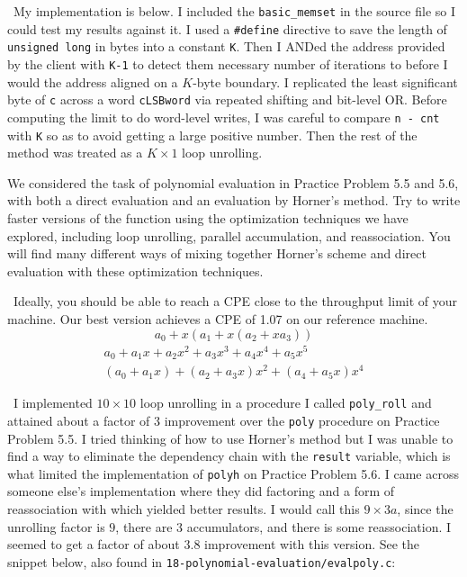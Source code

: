 \documentclass[12pt]{article}
\newenvironment{ex}[2][Exercise]{\begin{trivlist}
		\item[\hskip \labelsep {\bfseries #1}\hskip \labelsep {\bfseries #2.}]}{\end{trivlist}}
\newenvironment{sol}[1][Solution]{\begin{trivlist}
		\item[\hskip \labelsep {\bfseries #1:}]}{\end{trivlist}}
\begin{document}
\begin{sol}
	\
	My implementation is below. I included the \texttt{basic\_memset} in the source file
	so I could test my results against it. I used a \texttt{\#define} directive to save
	the length of \texttt{unsigned long} in bytes into a constant \texttt{K}. Then I
	ANDed the address provided by the client with \texttt{K-1} to detect them necessary
	number of iterations to before I would the address aligned on a $K$-byte boundary.
	I replicated the least significant byte of \texttt{c} across a word \texttt{cLSBword}
	via repeated shifting and bit-level OR. Before computing the limit to do word-level writes,
	I was careful to compare \texttt{n - cnt} with \texttt{K} so as to avoid getting a large
	positive number. Then the rest of the method was treated as a $K\times 1$ loop unrolling. 
	
\end{sol}

\begin{ex}{5.18}
	We considered the task of polynomial evaluation in Practice Problem 5.5 and 5.6, with both
	a direct evaluation and an evaluation by Horner's method. Try to write faster versions of
	the function using the optimization techniques we have explored, including loop unrolling,
	parallel accumulation, and reassociation. You will find many different ways of mixing
	together Horner's scheme and direct evaluation with these optimization techniques.
	
	\
	Ideally, you should be able to reach a CPE close to the throughput limit of your machine.
	Our best version achieves a CPE of 1.07 on our reference machine.
	\[
	a_0 + x(a_1 + x(a_2 + x a_3))
	\]
	\begin{align*}
		a_0+a_1x+a_2x^2+a_3x^3 + a_4x^4 + a_5 x^5\\
		(a_0 + a_1x) + (a_2 + a_3x) x^2 + (a_4 + a_5x)x^4
	\end{align*}
\end{ex}
 

\begin{sol}
	\
	I implemented $10\times 10$ loop unrolling in a procedure I called \texttt{poly\_roll} and
	attained about a factor of 3 improvement over the \texttt{poly} procedure on Practice Problem
	5.5. I tried thinking of how to use Horner's method but I was unable to find a way to eliminate
	the dependency chain with the \texttt{result} variable, which is what limited the
	implementation of \texttt{polyh} on Practice Problem 5.6. I came across someone else's
	implementation where they did factoring and a form of reassociation with which yielded better
	results. I would call this $9\times 3a$, since the unrolling factor is $9$, there are 3
	accumulators, and there is some reassociation. I seemed to get a factor of about $3.8$
	improvement with this version. See the snippet below, also found in
	\texttt{18-polynomial-evaluation/evalpoly.c}:
	
\end{sol}
\end{document}
